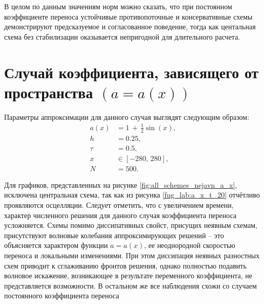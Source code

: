 \documentclass[a4paper,14pt]{extreport}
\begin{document}
В целом по данным значениям норм можно сказать, что при постоянном коэффициенте переноса устойчивые противопоточные и консервативные схемы демонстрируют предсказуемое и согласованное поведение, тогда как центальная схема без стабилизации оказывается непригодной для длительного расчета.

\section*{{Случай коэффициента, зависящего от пространства $(a=a(x))$}}

Параметры аппроксимации для данного случая выглядят следующим образом:
\[
\begin{aligned}
	a(x) &= 1\,+\,\frac{1}{2}\sin(x) , \\
	h &= 0.25, \\
	\tau &= 0.5, \\
	x &\in [-280,\,280], \\
	N &= 500.
\end{aligned}
\]

Для графиков, представленных на рисунке \ref{fig:all_schemes_nejavn_a_x}, исключена центральная схема, так как из рисунка \ref{fug_lab:a_x_t_20} отчётливо проявляются осцелляции. Следует отметить, что с увеличением времени, характер численного решения для данного случая коэффициента переноса усложняется. Схемы помимо диссипативных свойст, присущих неявным схемам, присутствуют волновые колебания аппроксимирующих решений -- это объясняется характером функции $a=a(x)$, ее неоднородной скоростью переноса и локальными изменениями. При этом диссипация неявных разностных схем приводит к сглаживанию фронтов решения, однако полностью подавить волновое искажение, возникающее в результате переменного коэффициента, не представляется возможности. В остальном же все наблюдения схожи со случаем постоянного коэффициента переноса
\end{document}
